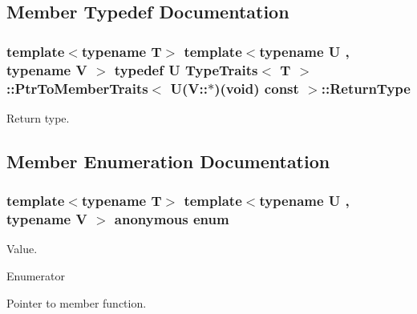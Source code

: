 \subsection{Member Typedef Documentation}
\subsubsection[{\texorpdfstring{Return\+Type}{ReturnType}}]{\setlength{\rightskip}{0pt plus 5cm}template$<$typename T$>$ template$<$typename U , typename V $>$ typedef U {\bf Type\+Traits}$<$ T $>$\+::{\bf Ptr\+To\+Member\+Traits}$<$ U(V\+::$\ast$)(void) const  $>$\+::{\bf Return\+Type}}\hypertarget{structTypeTraits_1_1PtrToMemberTraits_3_01U_07V_1_1_5_08_07void_08_01const_01_01_4_a01055d8df7fd507d0124dd7489d489b0}{}\label{structTypeTraits_1_1PtrToMemberTraits_3_01U_07V_1_1_5_08_07void_08_01const_01_01_4_a01055d8df7fd507d0124dd7489d489b0}
Return type. 

\subsection{Member Enumeration Documentation}
\subsubsection[{\texorpdfstring{anonymous enum}{anonymous enum}}]{\setlength{\rightskip}{0pt plus 5cm}template$<$typename T$>$ template$<$typename U , typename V $>$ anonymous enum}\hypertarget{structTypeTraits_1_1PtrToMemberTraits_3_01U_07V_1_1_5_08_07void_08_01const_01_01_4_a7d52bf1a56c79d867a3c686df58b08b2}{}\label{structTypeTraits_1_1PtrToMemberTraits_3_01U_07V_1_1_5_08_07void_08_01const_01_01_4_a7d52bf1a56c79d867a3c686df58b08b2}
Value. \begin{Desc}
\item[Enumerator]\par
\begin{description}
\item[{\em 
Is\+Pointer\+To\+Member\hypertarget{structTypeTraits_1_1PtrToMemberTraits_3_01U_07V_1_1_5_08_07void_08_01const_01_01_4_a7d52bf1a56c79d867a3c686df58b08b2a37aeb7c74ec4b01354e9e1740c244a01}{}\label{structTypeTraits_1_1PtrToMemberTraits_3_01U_07V_1_1_5_08_07void_08_01const_01_01_4_a7d52bf1a56c79d867a3c686df58b08b2a37aeb7c74ec4b01354e9e1740c244a01}
}]Pointer to member function. \end{description}
\end{Desc}

